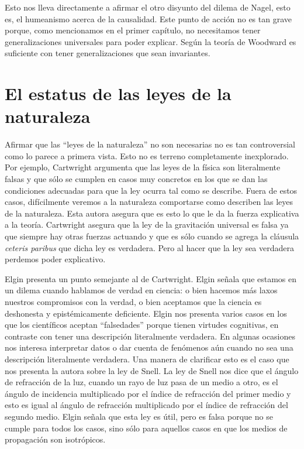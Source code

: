Esto nos lleva directamente a afirmar el otro disyunto del dilema de Nagel, esto es, el humeanismo acerca de la causalidad. Este punto de acción no es tan grave porque, como mencionamos en el primer capítulo, no necesitamos tener generalizaciones universales para poder explicar. Según la teoría de Woodward es suficiente con tener generalizaciones que sean invariantes.

\section{El estatus de las leyes de la naturaleza}

\noindent Afirmar que las ``leyes de la naturaleza'' no son necesarias no es tan controversial como lo parece a primera vista. Esto no es terreno completamente inexplorado. Por ejemplo, Cartwright \citeyear{Cartwright1983} argumenta que las leyes de la física son literalmente falsas y que sólo se cumplen en casos muy concretos en los que se dan las condiciones adecuadas para que la ley ocurra tal como se describe. Fuera de estos casos, difícilmente veremos a la naturaleza comportarse como describen las leyes de la naturaleza. Esta autora asegura que es esto lo que le da la fuerza explicativa a la teoría. Cartwright asegura que la ley de la gravitación universal es falsa ya que siempre hay otras fuerzas actuando y que es sólo cuando se agrega la cláusula \textit{ceteris paribus} que dicha ley es verdadera. Pero al hacer que la ley sea verdadera perdemos poder explicativo.

Elgin presenta un punto semejante al de Cartwright. Elgin \citeyear{Elgin2004} señala que estamos en un dilema cuando hablamos de verdad en ciencia: o bien hacemos más laxos nuestros compromisos con la verdad, o bien aceptamos que la ciencia es deshonesta y epistémicamente deficiente. Elgin nos presenta varios casos en los que los científicos aceptan ``falsedades'' porque tienen virtudes cognitivas, en contraste con tener una descripción literalmente verdadera. En algunas ocasiones nos interesa interpretar datos o dar cuenta de fenómenos aún cuando no sea una descripción literalmente verdadera. Una manera de clarificar esto es el caso que nos presenta la autora sobre la ley de Snell. La ley de Snell nos dice que el ángulo de refracción de la luz, cuando un rayo de luz pasa de un medio a otro, es el ángulo de incidencia multiplicado por el índice de refracción del primer medio y esto es igual al ángulo de refracción multiplicado por el índice de refracción del segundo medio. Elgin señala que esta ley es útil, pero es falsa porque no se cumple para todos los casos, sino sólo para aquellos casos en que los medios de propagación son isotrópicos.

